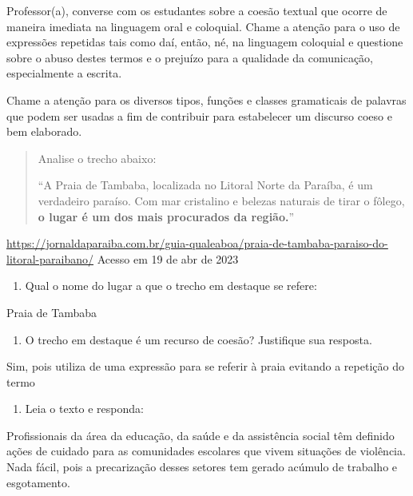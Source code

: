 {Professor(a), converse com os estudantes sobre a coesão textual que
ocorre de maneira imediata na linguagem oral e coloquial. Chame a
atenção para o uso de expressões repetidas tais como daí, então, né, na
linguagem coloquial e questione sobre o abuso destes termos e o prejuízo
para a qualidade da comunicação, especialmente a escrita.

Chame a atenção para os diversos tipos, funções e classes gramaticais de
palavras que podem ser usadas a fim de contribuir para estabelecer um
discurso coeso e bem elaborado.


\begin{quote}
Analise o trecho abaixo:

``A Praia de Tambaba, localizada no Litoral Norte da Paraíba, é um
verdadeiro paraíso. Com mar cristalino e belezas naturais de tirar o
fôlego, \textbf{o lugar é um dos mais procurados da região.}''
\end{quote}

\href{https://jornaldaparaiba.com.br/guia-qualeaboa/praia-de-tambaba-paraiso-do-litoral-paraibano/}{\uline{https://jornaldaparaiba.com.br/guia-qualeaboa/praia-de-tambaba-paraiso-do-litoral-paraibano/}}
Acesso em 19 de abr de 2023

\begin{enumerate}
\def\labelenumi{\arabic{enumi})}
\tightlist
\item
  Qual o nome do lugar a que o trecho em destaque se refere:
\end{enumerate}

Praia de Tambaba

\begin{enumerate}
\def\labelenumi{\arabic{enumi})}
\setcounter{enumi}{1}
\tightlist
\item
  O trecho em destaque é um recurso de coesão? Justifique sua resposta.
\end{enumerate}

Sim, pois utiliza de uma expressão para se referir à praia evitando a
repetição do termo

\begin{enumerate}
\def\labelenumi{\arabic{enumi})}
\setcounter{enumi}{2}
\tightlist
\item
  Leia o texto e responda:
\end{enumerate}

Profissionais da área da educação, da saúde e da assistência social têm
definido ações de cuidado para as comunidades escolares que vivem
situações de violência. Nada fácil, pois a precarização desses setores
tem gerado acúmulo de trabalho e esgotamento.

}
